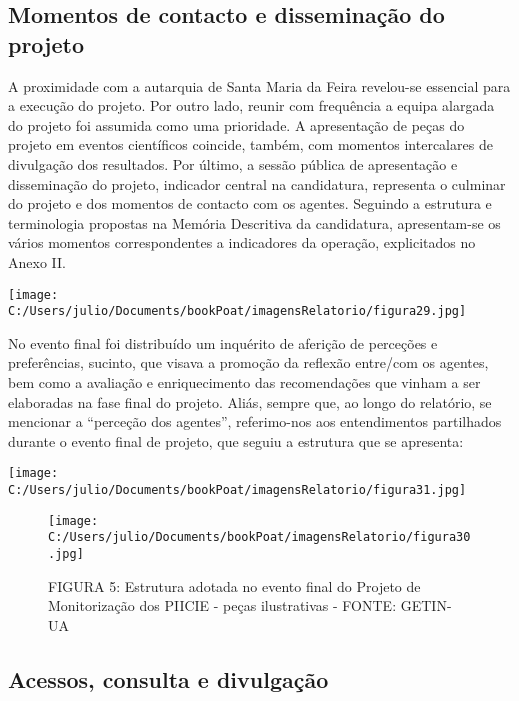 \documentclass[
]{book}
\begin{document}
\hypertarget{momentos-de-contacto-e-disseminauxe7uxe3o-do-projeto}{%
\subsection{\texorpdfstring{\textbf{Momentos de contacto e disseminação do projeto}}{Momentos de contacto e disseminação do projeto}}\label{momentos-de-contacto-e-disseminauxe7uxe3o-do-projeto}}

A proximidade com a autarquia de Santa Maria da Feira revelou-se essencial para a execução do projeto. Por outro lado, reunir com frequência a equipa alargada do projeto foi assumida como uma prioridade. A apresentação de peças do projeto em eventos científicos coincide, também, com momentos intercalares de divulgação dos resultados. Por último, a sessão pública de apresentação e disseminação do projeto, indicador central na candidatura, representa o culminar do projeto e dos momentos de contacto com os agentes. Seguindo a estrutura e terminologia propostas na Memória Descritiva da candidatura, apresentam-se os vários momentos correspondentes a indicadores da operação, explicitados no Anexo II.

\texttt{[image: C:/Users/julio/Documents/bookPoat/imagensRelatorio/figura29.jpg]}

No evento final foi distribuído um inquérito de aferição de perceções e preferências, sucinto, que visava a promoção da reflexão entre/com os agentes, bem como a avaliação e enriquecimento das recomendações que vinham a ser elaboradas na fase final do projeto. Aliás, sempre que, ao longo do relatório, se mencionar a ``perceção dos agentes'', referimo-nos aos entendimentos partilhados durante o evento final de projeto, que seguiu a estrutura que se apresenta:

\texttt{[image: C:/Users/julio/Documents/bookPoat/imagensRelatorio/figura31.jpg]}

\begin{figure}
\centering
\texttt{[image: C:/Users/julio/Documents/bookPoat/imagensRelatorio/figura30.jpg]}
\caption{FIGURA 5: Estrutura adotada no evento final do Projeto de Monitorização dos PIICIE - peças ilustrativas - FONTE: GETIN-UA}
\end{figure}

\hypertarget{acessos-consulta-e-divulgauxe7uxe3o}{%
\subsection{\texorpdfstring{\textbf{Acessos, consulta e divulgação}}{Acessos, consulta e divulgação}}\label{acessos-consulta-e-divulgauxe7uxe3o}}
\end{document}
